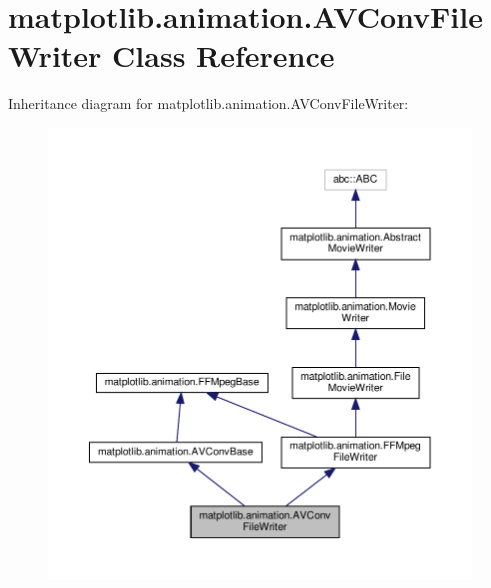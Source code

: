 \hypertarget{classmatplotlib_1_1animation_1_1AVConvFileWriter}{}\section{matplotlib.\+animation.\+A\+V\+Conv\+File\+Writer Class Reference}
\label{classmatplotlib_1_1animation_1_1AVConvFileWriter}


Inheritance diagram for matplotlib.\+animation.\+A\+V\+Conv\+File\+Writer\+:
\nopagebreak
\begin{figure}[H]
\begin{center}
\leavevmode
\includegraphics[width=350pt]{classmatplotlib_1_1animation_1_1AVConvFileWriter__inherit__graph}
\end{center}
\end{figure}


